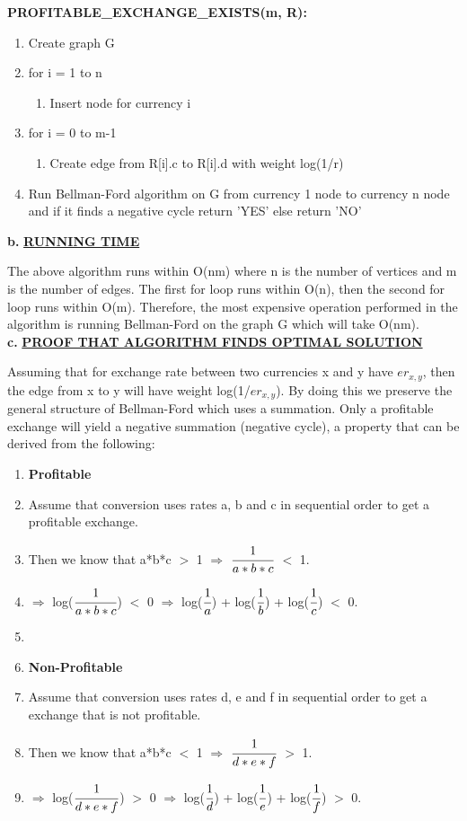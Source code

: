 \documentclass[11pt]{csc_assignment}
\begin{document}
\begin{description}
\textbf{PROFITABLE\_EXCHANGE\_EXISTS(m, R):}
\begin{enumerate}[leftmargin=5pt]
	\item[] Create graph G
	\item[] for i = 1 to n
	\begin{enumerate}
		\item[] Insert node for currency i
	\end{enumerate}
	\item[] for i = 0 to m-1
	\begin{enumerate}
		\item[] Create edge from R[i].c to R[i].d with weight log(1/r)
	\end{enumerate}
	\item[] Run Bellman-Ford algorithm on G from currency 1 node to currency n node and if it finds a negative cycle return 'YES' else return 'NO'
\end{enumerate}
\clearpage
\textbf{b.} \underline{\textbf{RUNNING TIME}}

The above algorithm runs within O(nm) where n is the number of vertices and m is the number of edges. The first for loop runs within O(n), then the second for loop runs within O(m). Therefore, the most expensive operation performed in the algorithm is running Bellman-Ford on the graph G which will take O(nm).\\

\textbf{c.} \underline{\textbf{PROOF THAT ALGORITHM FINDS OPTIMAL SOLUTION}}

Assuming that for exchange rate between two currencies x and y have $er_{x, y}$, then the edge from x to y will have weight log(1/$er_{x, y}$). By doing this we preserve the general structure of Bellman-Ford which uses a summation. Only a profitable exchange will yield a negative summation (negative cycle), a property that can be derived from the following:

\begin{enumerate}[leftmargin=5pt]
	\item[] \textbf{Profitable}
	\item[] Assume that conversion uses rates a, b and c in sequential order to get a profitable exchange.
	\item[] Then we know that a*b*c $>$ 1 $\Rightarrow$ $\cfrac{1}{a*b*c}$ $<$ 1.
	\item[] $\Rightarrow$ log($\cfrac{1}{a*b*c}$) $<$ 0 $\Rightarrow$ log($\cfrac{1}{a}$) + log($\cfrac{1}{b}$) + log($\cfrac{1}{c}$) $<$ 0.
	\item[]
	\item[] \textbf{Non-Profitable}
	\item[] Assume that conversion uses rates d, e and f in sequential order to get a exchange that is not profitable.
	\item[] Then we know that a*b*c $<$ 1 $\Rightarrow$ $\cfrac{1}{d*e*f}$ $>$ 1.
	\item[] $\Rightarrow$ log($\cfrac{1}{d*e*f}$) $>$ 0 $\Rightarrow$ log($\cfrac{1}{d}$) + log($\cfrac{1}{e}$) + log($\cfrac{1}{f}$) $>$ 0.
\end{enumerate}


\end{description}
\end{document}
